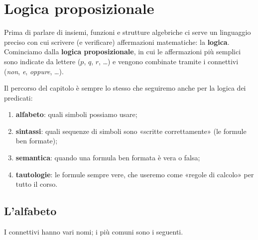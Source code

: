 \chapter{Logica proposizionale}

Prima di parlare di insiemi, funzioni e strutture algebriche ci serve un linguaggio preciso con cui scrivere
(e verificare) affermazioni matematiche: la \textbf{logica}. Cominciamo dalla \textbf{logica proposizionale},
in cui le affermazioni più semplici sono indicate da lettere ($p$, $q$, $r$, \dots) e vengono combinate
tramite i connettivi (\textit{non}, \textit{e}, \textit{oppure}, \dots).

Il percorso del capitolo è sempre lo stesso che seguiremo anche per la logica dei predicati:
\begin{enumerate}
    \item \textbf{alfabeto}: quali simboli possiamo usare;
    \item \textbf{sintassi}: quali sequenze di simboli sono «scritte correttamente» (le formule ben formate);
    \item \textbf{semantica}: quando una formula ben formata è vera o falsa;
    \item \textbf{tautologie}: le formule sempre vere, che useremo come «regole di calcolo» per tutto il corso.
\end{enumerate}

\section{L'alfabeto}\label{sec:alfabeto-prop}


I connettivi hanno vari nomi; i più comuni sono i seguenti.

